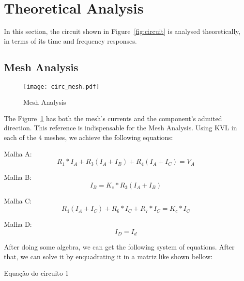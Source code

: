 \section{Theoretical Analysis}
\label{sec:analysis}

In this section, the circuit shown in Figure~\ref{fig:circuit} is analysed
theoretically, in terms of its time and frequency responses.

\subsection{Mesh Analysis}

\begin{figure}[h!] \centering
	\texttt{[image: circ\_mesh.pdf]}
	\caption{Mesh Analysis}
	\label{fig:circuitMesh}
\end{figure}

The Figure~\ref{fig:circuitMesh} has both the mesh's currents and the 
component's admited direction.
This reference is indispensable for the Mesh Analysis.
Using KVL in each of the 4 meshes, we achieve the following equations:
\vspace{0.5cm}

Malha A:
$$ R_1 * I_A + R_3(I_A+I_B) + R_4(I_A+I_C) = V_A$$

Malha B:
$$ I_B = K_c * R_3(I_A + I_B) $$

Malha C:
$$ R_4(I_A + I_C) + R_6 * I_C + R_7 * I_C = K_c * I_C $$

Malha D:
$$ I_D = I_d $$

\vspace{0.5cm}

After doing some algebra, we can get the following system of equations. After that, 
we can solve it by enquadrating it in a matriz like shown bellow:


\vspace{0.5cm}
Equação do circuito 1
\vspace{0.5cm}

